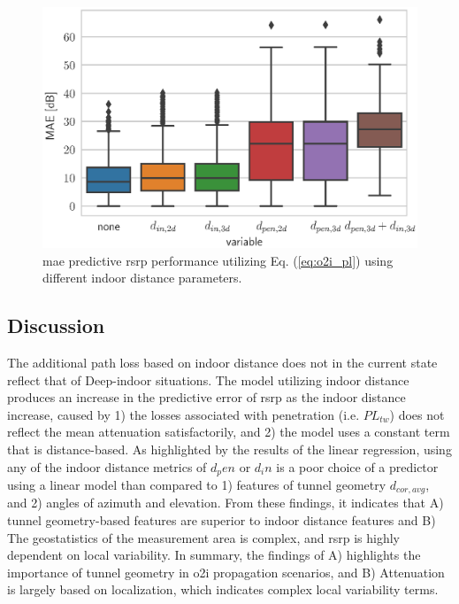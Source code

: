 \begin{figure}
    \centering
    \includegraphics{chapters/part_pathloss/figures/outdoor_to_indoor/results/mae_boxplot.eps}
    \caption{\gls{mae} predictive \gls{rsrp} performance utilizing Eq. (\ref{eq:o2i_pl}) using different indoor distance parameters.}
    \label{fig:mae_boxplot_o2i_pl_in}
\end{figure}

\subsection{Discussion}
The additional path loss based on indoor distance does not in the current state reflect that of Deep-indoor situations. The model utilizing indoor distance produces an increase in the predictive error of \gls{rsrp} as the indoor distance increase, caused by 1) the losses associated with penetration (i.e. $PL_{tw}$) does not reflect the mean attenuation satisfactorily, and 2) the model uses a constant term that is distance-based. As highlighted by the results of the linear regression, using any of the indoor distance metrics of $d_pen$ or $d_in$ is a poor choice of a predictor using a linear model than compared to 1) features of tunnel geometry $d_{cor,avg}$, and 2) angles of azimuth and elevation. From these findings, it indicates that A) tunnel geometry-based features are superior to indoor distance features and B) The geostatistics of the measurement area is complex, and \gls{rsrp} is highly dependent on local variability. In summary, the findings of A) highlights the importance of tunnel geometry in \gls{o2i} propagation scenarios, and B) Attenuation is largely based on localization, which indicates complex local variability terms.

